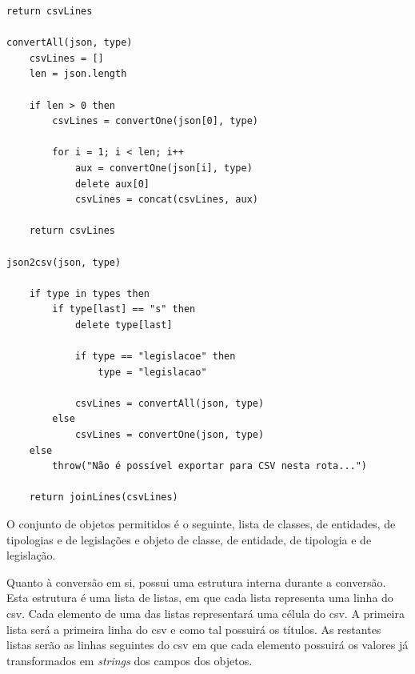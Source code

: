 \begin{lstlisting}[language=pseudocode, caption=Algorítmo de conversão de \acrshort{json} para \acrshort{csv}]
    return csvLines

convertAll(json, type)
    csvLines = []
    len = json.length

    if len > 0 then
        csvLines = convertOne(json[0], type)

        for i = 1; i < len; i++
            aux = convertOne(json[i], type)
            delete aux[0]
            csvLines = concat(csvLines, aux)

    return csvLines

json2csv(json, type)

    if type in types then
        if type[last] == "s" then
            delete type[last]

            if type == "legislacoe" then
                type = "legislacao"

            csvLines = convertAll(json, type)
        else
            csvLines = convertOne(json, type)
    else
        throw("Não é possível exportar para CSV nesta rota...")

    return joinLines(csvLines)
\end{lstlisting}

O conjunto de objetos permitidos é o seguinte, lista de classes, de entidades, de tipologias e de legislações e objeto de classe, de entidade, de tipologia e de legislação.

Quanto à conversão em si, possui uma estrutura interna durante a conversão. Esta estrutura é uma lista de listas, em que cada lista representa uma linha do \acrshort{csv}. Cada elemento de uma das listas representará uma célula do \acrshort{csv}. A primeira lista será a primeira linha do \acrshort{csv} e como tal possuirá os títulos. As restantes listas serão as linhas seguintes do \acrshort{csv} em que cada elemento possuirá os valores já transformados em \textit{strings} dos campos dos objetos.

